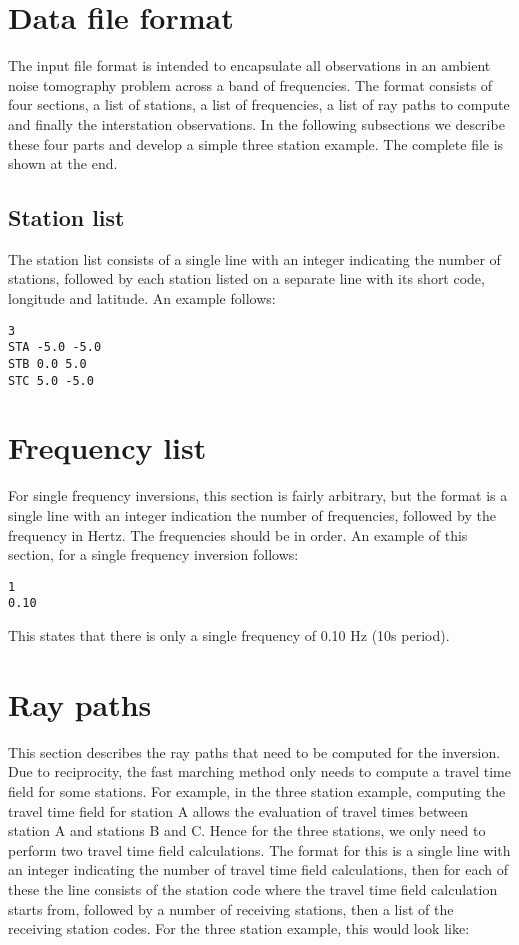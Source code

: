 \documentclass[a4paper,12pt]{article}
\begin{document}
\section{Data file format}
\label{sec:fileformat}

The input file format is intended to encapsulate all observations in
an ambient noise tomography problem across a band of frequencies. The
format consists of four sections, a list of stations, a list of
frequencies, a list of ray paths to compute and finally the
interstation observations.  In the following subsections we describe
these four parts and develop a simple three station example. The
complete file is shown at the end.

\subsection{Station list}

The station list consists of a single line with an integer indicating
the number of stations, followed by each station listed on a separate
line with its short code, longitude and latitude. An example follows:

\begin{verbatim}
3
STA -5.0 -5.0
STB 0.0 5.0
STC 5.0 -5.0
\end{verbatim}

\section{Frequency list}

For single frequency inversions, this section is fairly arbitrary, but
the format is a single line with an integer indication the number of
frequencies, followed by the frequency in Hertz. The frequencies
should be in order. An example of this section, for a single frequency
inversion follows:

\begin{verbatim}
1
0.10
\end{verbatim}

This states that there is only a single frequency of 0.10 Hz (10s period).

\section{Ray paths}

This section describes the ray paths that need to be computed for the
inversion. Due to reciprocity, the fast marching method only needs to
compute a travel time field for some stations. For example, in the
three station example, computing the travel time field for station A
allows the evaluation of travel times between station A and stations B
and C.  Hence for the three stations, we only need to perform two
travel time field calculations.  The format for this is a single line
with an integer indicating the number of travel time field
calculations, then for each of these the line consists of the station
code where the travel time field calculation starts from, followed by
a number of receiving stations, then a list of the receiving station
codes. For the three station example, this would look like:
\end{document}
